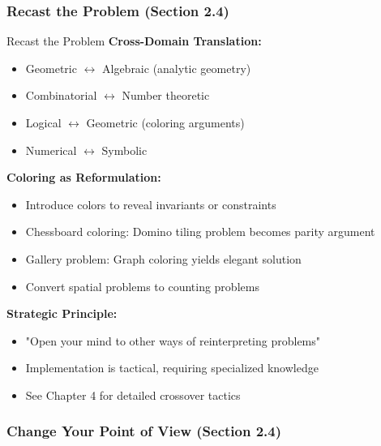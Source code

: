 \documentclass[12pt]{article}
\begin{document}
	\subsubsection{Recast the Problem (Section 2.4)}

\begin{strategybox}{Recast the Problem}
	\textbf{Cross-Domain Translation:}
	\begin{itemize}
		\item Geometric $\leftrightarrow$ Algebraic (analytic geometry)
		\item Combinatorial $\leftrightarrow$ Number theoretic
		\item Logical $\leftrightarrow$ Geometric (coloring arguments)
		\item Numerical $\leftrightarrow$ Symbolic
	\end{itemize}
	
	\textbf{Coloring as Reformulation:}
	\begin{itemize}
		\item Introduce colors to reveal invariants or constraints
		\item Chessboard coloring: Domino tiling problem becomes parity argument
		\item Gallery problem: Graph coloring yields elegant solution
		\item Convert spatial problems to counting problems
	\end{itemize}
	
	\textbf{Strategic Principle:}
	\begin{itemize}
		\item "Open your mind to other ways of reinterpreting problems"
		\item Implementation is tactical, requiring specialized knowledge
		\item See Chapter 4 for detailed crossover tactics
	\end{itemize}
\end{strategybox}

	\subsubsection{Change Your Point of View (Section 2.4)}
\end{document}
